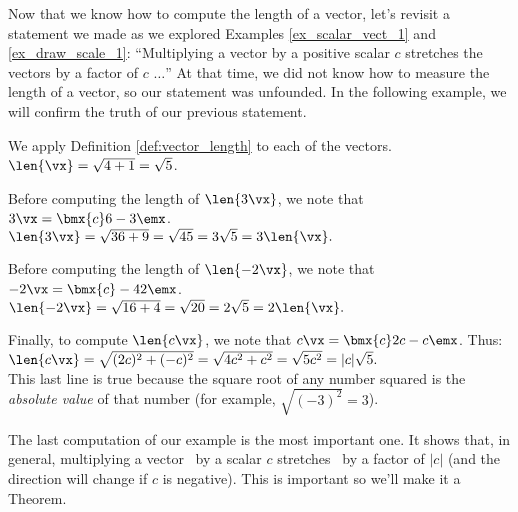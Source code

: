 \medskip

Now that we know how to compute the length of a vector, let's revisit a statement we made as we explored Examples \ref{ex_scalar_vect_1} and \ref{ex_draw_scale_1}: ``Multiplying a vector by a positive scalar $c$ stretches the vectors by a factor of $c$ $\ldots$'' At that time, we did not know how to measure the length of a vector, so our statement was unfounded. In the following example, we will confirm the truth of our previous statement.

\medskip

{We apply Definition \ref{def:vector_length} to each of the vectors.\\

$\len{\vx} = \sqrt{4+1} = \sqrt{5}$.

Before computing the length of $\len{3\vx}$, we note that $3\vx = \bmx{c} 6\\-3\emx$.\\

$\len{3\vx} = \sqrt{36+9} = \sqrt{45} = 3\sqrt{5} = 3\len{\vx}.$

Before computing the length of $\len{-2\vx}$, we note that $-2\vx = \bmx{c} -4\\2\emx$.\\

$\len{-2\vx} = \sqrt{16+4} = \sqrt{20} = 2\sqrt{5} = 2\len{\vx}.$

Finally, to compute $\len{c\vx}$, we note that $c\vx = \bmx{c} 2c\\-c\emx$. Thus:\\

$\len{c\vx} = \sqrt{(2c)^2 + (-c)^2} = \sqrt{4c^2 + c^2} = \sqrt{5c^2} = |c|\sqrt{5}.$\\

This last line is true because the square root of any number squared is the \textit{absolute value} of that number (for example, $\sqrt{(-3)^2} = 3$).}

\medskip

The last computation of our example is the most important one. It shows that, in general, multiplying a vector \vx\ by a scalar $c$ stretches \vx\ by a factor of $|c|$ (and the direction will change if $c$ is negative). This is important so we'll make it a Theorem.

